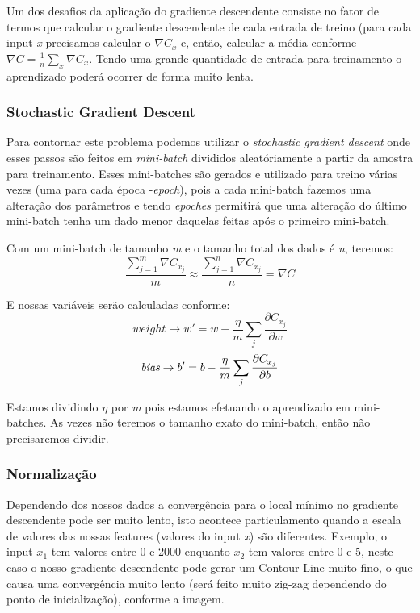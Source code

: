 \documentclass[11pt,a4paper,leqno]{article}
\begin{document}
Um dos desafios da aplicação do gradiente descendente consiste no fator de termos que calcular o gradiente descendente de cada entrada de treino (para cada input \emph{x} precisamos calcular o $\nabla C_x$ e, então, calcular a média conforme $\nabla C = \frac{1}{n}
\sum_x \nabla C_x$. Tendo uma grande quantidade de entrada para treinamento o aprendizado poderá ocorrer de forma muito lenta.


\subsubsection{Stochastic Gradient Descent}
Para contornar este problema podemos utilizar o \emph{stochastic gradient descent} onde esses passos são feitos em \emph{mini-batch} divididos aleatóriamente a partir da amostra para treinamento.
Esses mini-batches são gerados e utilizado para treino várias vezes (uma para cada época -\emph{epoch}), pois a cada mini-batch fazemos uma alteração dos parâmetros e tendo \emph{epoches} permitirá que uma alteração do último mini-batch tenha um dado menor daquelas feitas após o primeiro mini-batch.

Com um mini-batch de tamanho \emph{m} e o tamanho total dos dados é \emph{n}, teremos:
\[
  \frac{\sum_{j=1}^m \nabla C_{x_{j}}}{m} \approx \frac{\sum_{j=1}^n \nabla C_{x_{j}}}{n} = \nabla C
\]

E nossas variáveis serão calculadas conforme:
\[
  weight \rightarrow w' = w-\frac{\eta}{m}
  \sum_j \frac{\partial C_{x_j}}{\partial w}
\]
\[
  \emph{bias} \rightarrow b' = b-\frac{\eta}{m}
  \sum_j \frac{\partial C_{x_j}}{\partial b}
\]

Estamos dividindo $\eta$ por \emph{m} pois estamos efetuando o aprendizado em mini-batches. As vezes não teremos o tamanho exato do mini-batch, então não precisaremos dividir.


\subsubsection{Normalização}
Dependendo dos nossos dados a convergência para o local mínimo no gradiente descendente pode ser muito lento, isto acontece particulamento quando a escala de valores das nossas features (valores do input \emph{x}) são diferentes.
Exemplo, o input $x_1$ tem valores entre 0 e 2000 enquanto $x_2$ tem valores entre 0 e 5, neste caso o nosso gradiente descendente pode gerar um Contour Line muito fino, o que causa uma convergência muito lento (será feito muito zig-zag dependendo do ponto de inicialização), conforme a imagem.\\
\end{document}

